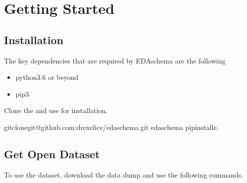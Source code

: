 \documentclass[letterpaper,10pt,english]{sphinxmanual}
\begin{document}
\chapter{Getting Started}
\label{\detokenize{index:getting-started}}

\section{Installation}
\label{\detokenize{index:installation}}
\sphinxAtStartPar
The key dependencies that are required by EDA\sphinxhyphen{}schema are the following
\begin{itemize}
\item {} 
\sphinxAtStartPar
python3.6 or beyond

\item {} 
\sphinxAtStartPar
pip3

\end{itemize}

\sphinxAtStartPar
Clone the  and use  for installation.

\begin{sphinxVerbatim}[commandchars=\\\{\}]
\PYGZdl{}gitclonegit@github.com:drexel\PYGZhy{}ice/eda\PYGZhy{}schema.git
\PYGZdl{}eda\PYGZhy{}schema
\PYGZdl{}pipinstall\PYGZhy{}e.
\end{sphinxVerbatim}


\section{Get Open Dataset}
\label{\detokenize{index:get-open-dataset}}
\sphinxAtStartPar
To use the dataset, download the data dump and use the following commands.

\begin{sphinxVerbatim}[commandchars=\\\{\}]
   
   

  
  
\end{sphinxVerbatim}
\end{document}
